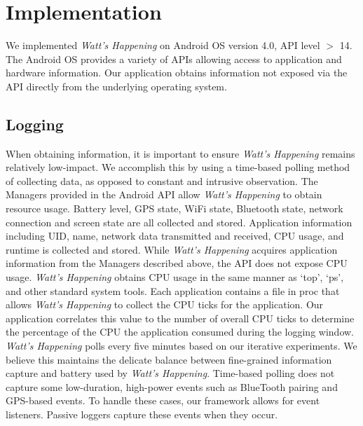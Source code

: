 \section{Implementation}
\label{sec:implementation}
We implemented \emph{Watt's Happening} on Android OS version 4.0, API level $>$ 14. 
The Android OS provides a variety of APIs allowing access to application and hardware information.
Our application obtains information not exposed via the API directly from the underlying operating system.

\subsection{Logging}
\label{subsec:impl_logging}
When obtaining information, it is important to ensure \emph{Watt's Happening} remains relatively low-impact.
We accomplish this by using a time-based polling method of collecting data, as opposed to constant and intrusive observation.
The Managers provided in the Android API allow \emph{Watt's Happening} to obtain resource usage.
Battery level, GPS state, WiFi state, Bluetooth state, network connection and screen state are all collected and stored.
Application information including UID, name, network data transmitted and received, CPU usage, and runtime is collected and stored. 
%
While \emph{Watt's Happening} acquires application information from the Managers described above, the API does not expose CPU usage.
\emph{Watt's Happening} obtains CPU usage in the same manner as `top', `ps', and other standard system tools.
Each application contains a file in proc that allows \emph{Watt's Happening} to collect the CPU ticks for the application.
%
Our application correlates this value to the number of overall CPU ticks to determine the percentage of the CPU the application consumed during the logging window.
\emph{Watt's Happening} polls every five minutes based on our iterative experiments.
We believe this maintains the delicate balance between fine-grained information capture and battery used by \emph{Watt's Happening}.
Time-based polling does not capture some low-duration, high-power events such as BlueTooth pairing and GPS-based events.
To handle these cases, our framework allows for event listeners.
Passive loggers capture these events when they occur.

